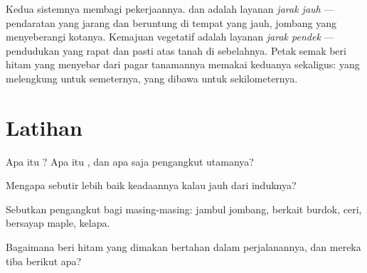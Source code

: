 \begin{remark}\label{rem:g6:how-plants-spread:twospeeds}
Kedua sistemnya membagi pekerjaannya.  dan  adalah layanan
\emph{jarak jauh} --- pendaratan yang jarang dan beruntung di tempat
yang jauh, jombang yang menyeberangi kotanya. Kemajuan vegetatif
adalah layanan \emph{jarak pendek} --- pendudukan yang rapat dan pasti
atas tanah di sebelahnya. Petak semak beri hitam yang menyebar dari
pagar tanamannya memakai keduanya sekaligus:  yang melengkung
untuk semeternya,  yang dibawa  untuk sekilometernya.
\end{remark}

\section{Latihan}

\begin{exercise}[$\star$]\label{exo:g6:how-plants-spread:1}
Apa itu ? Apa itu , dan apa saja pengangkut
utamanya?
\end{exercise}

\begin{exercise}[$\star$]\label{exo:g6:how-plants-spread:2}
Mengapa sebutir  lebih baik keadaannya kalau  jauh dari
induknya?
\end{exercise}

\begin{exercise}[$\star$]\label{exo:g6:how-plants-spread:3}
Sebutkan pengangkut bagi masing-masing: jambul jombang,  berkait
burdok,  ceri,  bersayap maple,  kelapa.
\end{exercise}

\begin{exercise}[$\star$]\label{exo:g6:how-plants-spread:4}
Bagaimana  beri hitam yang dimakan  bertahan dalam
perjalanannya, dan mereka tiba berikut apa?
\end{exercise}

